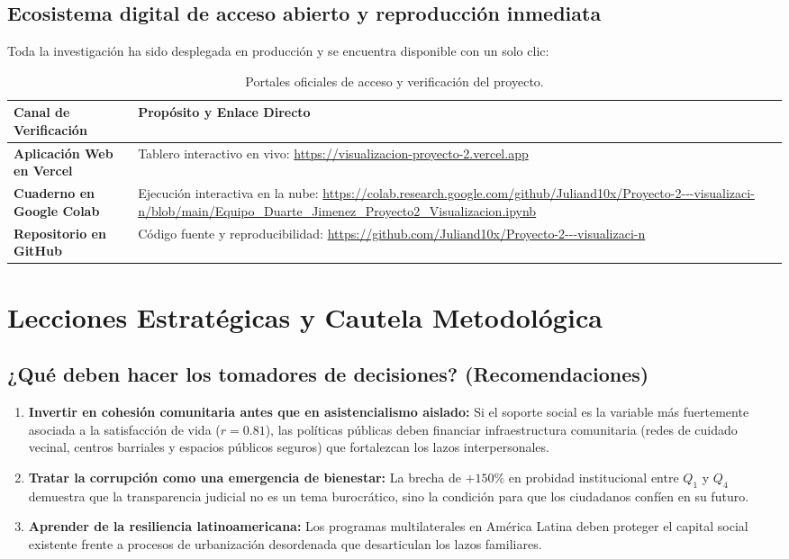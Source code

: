 \documentclass[9.5pt, a4paper]{article}
\begin{document}
\subsection{Ecosistema digital de acceso abierto y reproducción inmediata}
Toda la investigación ha sido desplegada en producción y se encuentra disponible con un solo clic:

\begin{table}[htbp]
    \centering
    \small
    \caption{Portales oficiales de acceso y verificación del proyecto.}
    \label{tab:recursos}
    \begin{tabularx}{\textwidth}{p{4.5cm} X}
        \toprule
        \textbf{Canal de Verificación} & \textbf{Propósito y Enlace Directo} \\
        \midrule
        \textbf{Aplicación Web en Vercel} & Tablero interactivo en vivo: \url{https://visualizacion-proyecto-2.vercel.app} \\
        \textbf{Cuaderno en Google Colab} & Ejecución interactiva en la nube: \url{https://colab.research.google.com/github/Juliand10x/Proyecto-2---visualizaci-n/blob/main/Equipo_Duarte_Jimenez_Proyecto2_Visualizacion.ipynb} \\
        \textbf{Repositorio en GitHub} & Código fuente y reproducibilidad: \url{https://github.com/Juliand10x/Proyecto-2---visualizaci-n} \\
        \bottomrule
    \end{tabularx}
\end{table}

\vspace{-0.2cm}

\section{Lecciones Estratégicas y Cautela Metodológica}

\subsection{¿Qué deben hacer los tomadores de decisiones? (Recomendaciones)}
\begin{enumerate}
    \item \textbf{Invertir en cohesión comunitaria antes que en asistencialismo aislado:} Si el soporte social es la variable más fuertemente asociada a la satisfacción de vida ($r = 0.81$), las políticas públicas deben financiar infraestructura comunitaria (redes de cuidado vecinal, centros barriales y espacios públicos seguros) que fortalezcan los lazos interpersonales.
    \item \textbf{Tratar la corrupción como una emergencia de bienestar:} La brecha de $+150\%$ en probidad institucional entre $Q_1$ y $Q_4$ demuestra que la transparencia judicial no es un tema burocrático, sino la condición para que los ciudadanos confíen en su futuro.
    \item \textbf{Aprender de la resiliencia latinoamericana:} Los programas multilaterales en América Latina deben proteger el capital social existente frente a procesos de urbanización desordenada que desarticulan los lazos familiares.
\end{enumerate}
\end{document}
